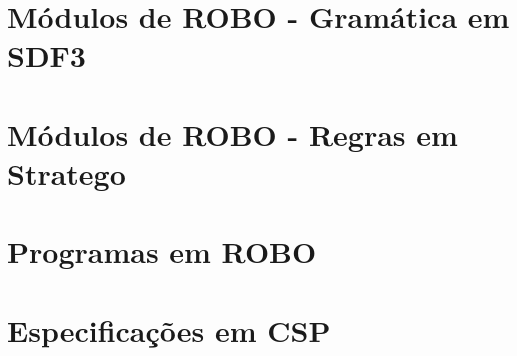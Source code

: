 \appendix

\chapter{Módulos de ROBO - Gramática em SDF3}
\label{apendice1}






\chapter{Módulos de ROBO - Regras em Stratego}
\label{apendice2}

\chapter{Programas em ROBO}
\label{apendice3}


\chapter{Especificações em CSP}
\label{apendice4}

